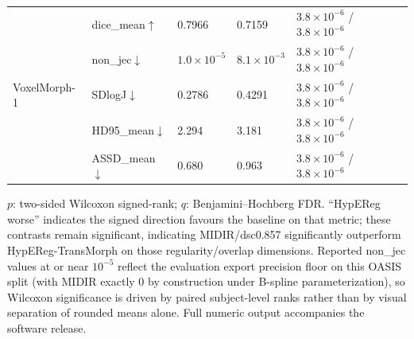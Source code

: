 \documentclass[11pt,a4paper]{article}
\begin{document}
\begin{table}[H]
\begin{tabularx}{\textwidth}{llXXX}
\midrule
\multirow{5}{*}{VoxelMorph-1} & dice\_mean\(\uparrow\) & 0.7966 & 0.7159 & $3.8\times10^{-6}$ / $3.8\times10^{-6}$ \\
 & non\_jec\(\downarrow\) & $1.0\times10^{-5}$ & $8.1\times10^{-3}$ & $3.8\times10^{-6}$ / $3.8\times10^{-6}$ \\
 & SDlogJ\(\downarrow\) & 0.2786 & 0.4291 & $3.8\times10^{-6}$ / $3.8\times10^{-6}$ \\
 & HD95\_mean\(\downarrow\) & 2.294 & 3.181 & $3.8\times10^{-6}$ / $3.8\times10^{-6}$ \\
 & ASSD\_mean\(\downarrow\) & 0.680 & 0.963 & $3.8\times10^{-6}$ / $3.8\times10^{-6}$ \\
\bottomrule
\end{tabularx}
\parbox{\textwidth}{\footnotesize $p$: two-sided Wilcoxon signed-rank; $q$: Benjamini--Hochberg FDR. ``HypEReg worse'' indicates the signed direction favours the baseline on that metric; these contrasts remain significant, indicating MIDIR/dsc0.857 significantly outperform HypEReg-TransMorph on those regularity/overlap dimensions. Reported non\_jec values at or near \(10^{-5}\) reflect the evaluation export precision floor on this OASIS split (with MIDIR exactly 0 by construction under B-spline parameterization), so Wilcoxon significance is driven by paired subject-level ranks rather than by visual separation of rounded means alone. Full numeric output accompanies the software release.}
\end{table}
\end{document}
